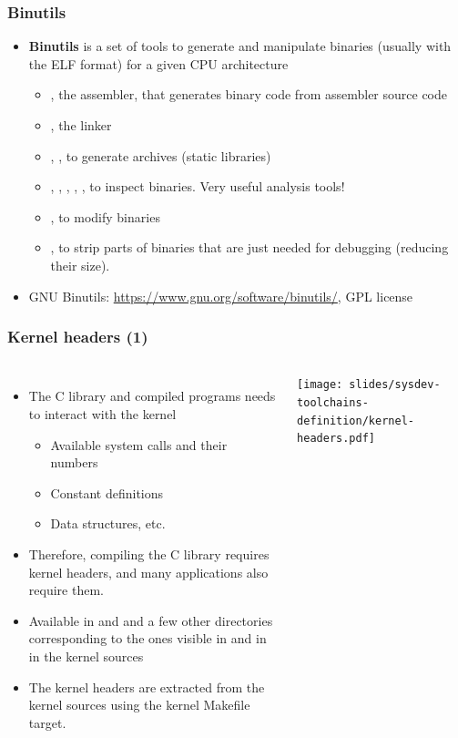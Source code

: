 \begin{frame}
  \frametitle{Binutils}
  \begin{itemize}
  \item {\bf Binutils} is a set of tools to generate and manipulate
    binaries (usually with the ELF format) for a given CPU architecture
    \begin{itemize}
    \item {}, the assembler, that generates binary code from
      assembler source code
    \item {}, the linker
    \item {}, , to generate  archives
     (static libraries)
    \item {}, , , ,
      , to inspect binaries. Very useful analysis tools!
    \item {}, to modify binaries
    \item {}, to strip parts of binaries that are just needed
      for debugging (reducing their size).
    \end{itemize}
  \item GNU Binutils: \url{https://www.gnu.org/software/binutils/}, GPL license
  \end{itemize}
\end{frame}

\begin{frame}
  \frametitle{Kernel headers (1)}
  \begin{columns}
    \begin{itemize}
    \item The C library and compiled programs needs to interact with the kernel
      \begin{itemize}
      \item Available system calls and their numbers
      \item Constant definitions
      \item Data structures, etc.
      \end{itemize}
    \item Therefore, compiling the C library requires kernel headers, and many
      applications also require them.
    \item Available in  and  and a few
      other directories corresponding to the ones visible in
       and in  in the kernel sources
    \item The kernel headers are extracted from the kernel sources using
      the  kernel Makefile target.
    \end{itemize}
    \texttt{[image: slides/sysdev-toolchains-definition/kernel-headers.pdf]}
  \end{columns}
\end{frame}

